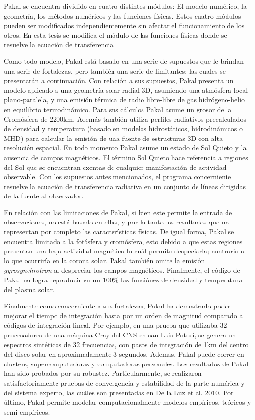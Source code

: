 Pakal se encuentra dividido en cuatro distintos m\'odulos: El modelo num\'erico, la geometr\'ia, los m\'etodos num\'ericos y las funciones f\'isicas. Estos cuatro m\'odulos pueden ser modificados independientemente sin afectar el funcionamiento de los otros. En esta tesis se modifica el m\'odulo de las funciones f\'isicas donde se resuelve la ecuaci\'on de transferencia.

Como todo modelo, Pakal est\'a basado en una serie de supuestos que le brindan una serie de fortalezas, pero tambi\'en una serie de limitantes; las cuales se presentar\'an a continuaci\'on. Con relaci\'on a sus supuestos, Pakal presenta un modelo aplicado a una geometr\'ia solar radial 3D, asumiendo una atm\'osfera local plano-paralela, y una emisi\'on t\'ermica de radio libre-libre de gas hidr\'ogeno-helio en equilibrio termodin\'amico. Para sus c\'alculos Pakal asume un grosor de la Crom\'osfera de 2200km. Adem\'as tambi\'en utiliza perfiles radiativos precalculados de densidad y temperatura (basado en modelos hidrost\'aticos, hidrodin\'amicos o MHD) para calcular la emisi\'on de una fuente de estructuras 3D con alta resoluci\'on espacial. En todo momento Pakal asume un estado de Sol Quieto y la ausencia de campos magn\'eticos. El t\'ermino Sol Quieto hace referencia a regiones del Sol que se encuentran exentas de cualquier manifestaci\'on de actividad observable. Con los supuestos antes mencionados, el programa concerniente resuelve la ecuaci\'on de transferencia radiativa en un conjunto de l\'ineas dirigidas de la fuente al observador.

En relaci\'on con las limitaciones de Pakal, si bien este permite la entrada de observaciones, no est\'a basado en ellas, y por lo tanto los resultados que no representan por completo las caracter\'isticas f\'isicas. De igual forma, Pakal se encuentra limitado a la fot\'osfera y crom\'osfera, esto debido a que estas regiones presentan una baja actividad magn\'etica lo cu\'al permite despeciarla; contrario a lo que ocurrir\'ia en la corona solar. Pakal tambi\'en omite la emisi\'on \emph{gyrosynchrotron} al despreciar los campos magn\'eticos. Finalmente, el c\'odigo de Pakal no logra reproducir en un 100\% las funci\'ones de densidad y temperatura del plasma solar.
 
Finalmente como concerniente a sus fortalezas, Pakal ha demostrado poder mejorar el tiempo de integraci\'on hasta por un orden de magnitud comparado a c\'odigos de integraci\'on lineal. Por ejemplo, en una prueba que utilizaba 32 procesadores de una m\'aquina Cray del CNS en san Luis Potos\'i, se generaron espectros sint\'eticos de 32 frecuencias, con pasos de integraci\'on de 1km del centro del disco solar en aproximadamente 3 segundos. Adem\'as, Pakal puede correr en clusters, supercomputadoras y computadoras personales. Los resultados de Pakal han sido probados por su robustez. Particularmente, se realizaron satisfactoriamente pruebas de convergencia y estabilidad de la parte num\'erica y del sistema experto, las cu\'ales son presentadas en De la Luz et al. 2010. Por \'ultimo, Pakal permite modelar computacionalmente modelos emp\'iricos, te\'oricos y semi emp\'iricos. 

